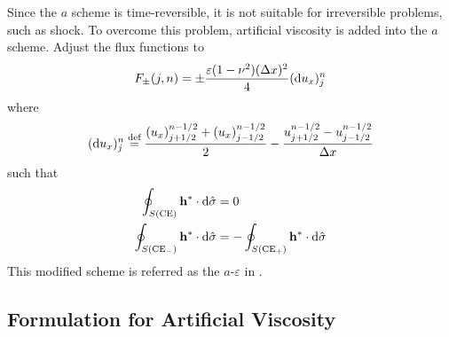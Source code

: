 \documentclass{turgon}
\begin{document}
Since the $a$ scheme is time-reversible, it is not suitable for irreversible
problems, such as shock.  To overcome this problem, artificial viscosity is
added into the $a$ scheme.  Adjust the flux functions to
\begin{align}
  F_{\pm}(j,n) = \pm\frac{\varepsilon(1-\nu^2)(\Delta x)^2}{4}(\mathop{}\!\mathrm{d} u_x)_j^n
    \label{e:aeconserv}
\end{align}
where
\begin{align*}
  (\dif u_x)_j^n \defeq
    \frac{(u_x)_{j+1/2}^{n-1/2} + (u_x)_{j-1/2}^{n-1/2}}{2}
  - \frac{u_{j+1/2}^{n-1/2} - u_{j-1/2}^{n-1/2}}{\Delta x}
\end{align*}
such that
\begin{align*}
    \oint_{S(\mathrm{CE}  )}\mathbf{h}^*\cdot \mathop{}\!\mathrm{d}\hat{\sigma} &= 0 \\
    \oint_{S(\mathrm{CE}_-)}\mathbf{h}^*\cdot \mathop{}\!\mathrm{d}\hat{\sigma} &=
  - \oint_{S(\mathrm{CE}_+)}\mathbf{h}^*\cdot \mathop{}\!\mathrm{d}\hat{\sigma}
\end{align*}
This modified scheme is referred as the $a$-$\varepsilon$ in
\citep[][Section 3]{chang_method_1995}.

\subsection{Formulation for Artificial Viscosity}
\end{document}
